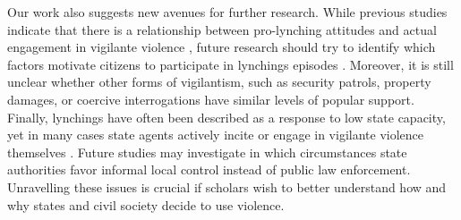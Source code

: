 \documentclass[12pt,a4paper]{article}
\begin{document}
Our work also suggests new avenues for further research. While previous studies
indicate that there is a relationship between pro-lynching attitudes and actual
engagement in vigilante violence \citep{weisburd1988vigilantism}, future
research should try to identify which factors motivate citizens to participate
in lynchings episodes \citep{nivette2016institutional}. Moreover, it is still
unclear whether other forms of vigilantism, such as security patrols, property
damages, or coercive interrogations \citep{bateson2020politics} have similar
levels of popular support. Finally, lynchings have often been described as a
response to low state capacity, yet in many cases state agents actively incite
or engage in vigilante violence themselves \citep{arias2010violent}. Future
studies may investigate in which circumstances state authorities favor informal
local control instead of public law enforcement. Unravelling these issues is
crucial if scholars wish to better understand how and why states and civil
society decide to use violence.

\setlength{\parindent}{0cm}
\setlength{\parskip}{5pt}


\end{document}
